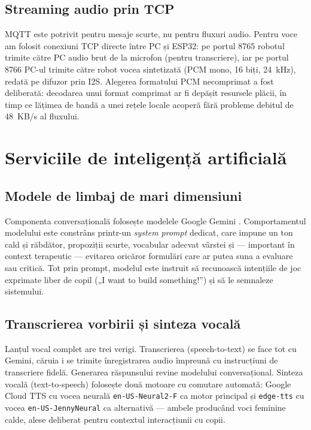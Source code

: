 \subsection{Streaming audio prin TCP}

MQTT este potrivit pentru mesaje scurte, nu pentru fluxuri audio. Pentru voce am folosit conexiuni TCP directe între PC și ESP32: pe portul 8765 robotul trimite către PC audio brut de la microfon (pentru transcriere), iar pe portul 8766 PC-ul trimite către robot vocea sintetizată (PCM mono, 16 biți, 24~kHz), redată pe difuzor prin I2S. Alegerea formatului PCM necomprimat a fost deliberată: decodarea unui format comprimat ar fi depășit resursele plăcii, în timp ce lățimea de bandă a unei rețele locale acoperă fără probleme debitul de 48~KB/s al fluxului.

\section{Serviciile de inteligență artificială}

\subsection{Modele de limbaj de mari dimensiuni}

Componenta conversațională folosește modelele Google Gemini \cite{gemini}. Comportamentul modelului este constrâns printr-un \emph{system prompt} dedicat, care impune un ton cald și răbdător, propoziții scurte, vocabular adecvat vârstei și — important în context terapeutic — evitarea oricăror formulări care ar putea suna a evaluare sau critică. Tot prin prompt, modelul este instruit să recunoască intențiile de joc exprimate liber de copil („I want to build something!”) și să le semnaleze sistemului.

\subsection{Transcrierea vorbirii și sinteza vocală}

Lanțul vocal complet are trei verigi. Transcrierea (speech-to-text) se face tot cu Gemini, căruia i se trimite înregistrarea audio împreună cu instrucțiuni de transcriere fidelă. Generarea răspunsului revine modelului conversațional. Sinteza vocală (text-to-speech) folosește două motoare cu comutare automată: Google Cloud TTS cu vocea neurală \texttt{en-US-Neural2-F} ca motor principal și \texttt{edge-tts} cu vocea \texttt{en-US-JennyNeural} ca alternativă — ambele producând voci feminine calde, alese deliberat pentru contextul interacțiunii cu copii.

